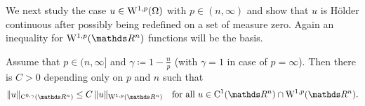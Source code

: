 We next study the case $u \in \mathrm{W}^{1,p}(\Omega)$ with $p \in (n,\infty)$ and show that $u$ is Hölder continuous after possibly being redefined on a set of measure zero.
Again an inequality for $\WW^{1,p}(\R^n)$ functions will be the basis.

\begin{thm}
  \label{thm:morrey}
Assume that $p \in (n,\infty]$ and $\gamma \coloneqq 1 - \frac{n}{p}$ (with $\gamma = 1$ in case of $p = \infty$).
Then there is $C > 0$ depending only on $p$ and $n$ such that
\begin{equation}
  \label{eq:morrey}
  \|u\|_{\CC^{0,\gamma}(\R^n)} \leq C \, \|u\|_{\WW^{1,p}(\R^n)} \quad\text{for all } u \in \CC^1(\R^n) \cap \WW^{1,p}(\R^n).
\end{equation}
\end{thm}

